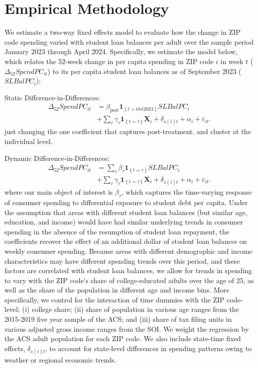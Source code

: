 \documentclass[12pt]{article}
\begin{document}
\section{Empirical Methodology \label{sec:methodology}}
We estimate a two-way fixed effects model to evaluate how the change in ZIP code spending varied with student loan balances per adult over the sample period January 2023 through April 2024. %
Specifically, we estimate the model below, which relates the 52-week change in per capita spending in ZIP code $i$ in week $t$ ($\Delta_{52} SpendPC_{it}$) to its per capita student loan balances as of September 2023 ($SLBalPC_{i}$):

Static Difference-in-Differences:
\begin{align}\label{eq:static-did}
    \Delta_{52} SpendPC_{it} 
    &= \beta_\text{post} \mathbf{1}_{\left\{ t > Oct2023 \right\}}SLBalPC_{i} \nonumber \\
    &+  \sum_{\tau} \gamma _\tau \mathbf{1}_{\left\{ t = \tau \right\}} \mathbf{X}_i + \delta_{s(i)t} + \alpha_{i} + \varepsilon_{it}.\end{align}
    just changing the one coefficient that captures post-treatment. and cluster at the individual level.
    
Dynamic Difference-in-Differences:
\begin{align}\label{eq:event-study}
    \Delta_{52} SpendPC_{it} 
    &= \sum_{\tau} \beta_{\tau} \mathbf{1}_{\left\{ t = \tau \right\}}SLBalPC_{i} \nonumber \\
    &+ \sum_{\tau} \gamma _\tau \mathbf{1}_{\left\{ t = \tau \right\}} \mathbf{X}_i + \delta_{s(i)t} + \alpha_{i} + \varepsilon_{it}.\end{align}
\noindent where our main object of interest is $\beta_\tau$, which captures the time-varying response of consumer spending to differential exposure to student debt per capita. Under the assumption that areas with different student loan balances (but similar age, education, and income) would have had similar underlying trends in consumer spending in the absence of the resumption of student loan repayment, the coefficients recover the effect of an additional dollar of student loan balances on weekly consumer spending. Because areas with different demographic and income characteristics may have different spending trends over this period, and these factors are correlated with student loan balances, we allow for trends in spending to vary with the ZIP code’s share of college-educated adults over the age of 25, as well as the share of the population in different age and income bins. 
More specifically, we control for the interaction of time dummies with the ZIP code-level: (i) college share; (ii) share of population in various age ranges from the 2015-2019 five year sample of the ACS; and (iii) share of tax filing units in various adjusted gross income ranges from the SOI. We weight the regression by the ACS adult population for each ZIP code. 
We also include state-time fixed effects, $\delta_{s(i)t}$, to account for state-level differences in spending patterns owing to weather or regional economic trends.
\end{document}
